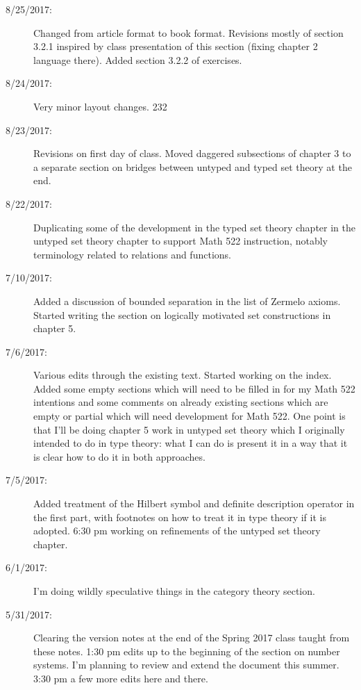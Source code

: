 \documentclass[12pt]{book}
\begin{document}
{\begin{description}
\item[8/25/2017:]  Changed from article format to book format.  Revisions mostly of section 3.2.1 inspired by class presentation of this section (fixing chapter 2 language there).  Added section 3.2.2 of exercises.

\item[8/24/2017:]  Very minor layout changes.
232
\item[8/23/2017:]  Revisions on first day of class.  Moved daggered subsections of chapter 3 to a separate section on bridges between untyped and typed set theory at the end.

\item[8/22/2017:]  Duplicating some of the development in the typed set theory chapter in the untyped set theory chapter to support Math 522 instruction, notably terminology related to relations and functions.

\item[7/10/2017:]  Added a discussion of bounded separation in the list of Zermelo axioms.  Started writing the section on logically motivated set constructions in chapter 5.

\item[7/6/2017:]  Various edits through the existing text.  Started working on the index.  Added some empty sections which will need to be filled in for my Math 522 intentions and some comments on already existing sections which are empty or partial which will need development for Math 522.  One point is that I'll be doing chapter 5 work in untyped set theory which I originally intended to do in type theory:  what I can do is present it in a way that it is clear how to do it in both approaches.

\item[7/5/2017:]  Added treatment of the Hilbert symbol and definite description operator in the first part, with footnotes on how to treat it in type theory if it is adopted.  6:30 pm working on refinements of the untyped set theory chapter.

\item[6/1/2017:]  I'm doing wildly speculative things in the category theory section.

\item[5/31/2017:]  Clearing the version notes at the end of the Spring 2017 class taught from these notes.  1:30 pm edits up to the beginning of the section on number systems.  I'm planning to review and extend the document this summer.  3:30 pm a few more edits here and there.

\end{description}}
\end{document}
